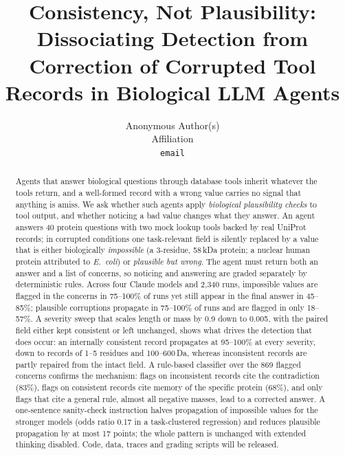 \documentclass{article}
\title{Consistency, Not Plausibility: Dissociating Detection from Correction of Corrupted Tool Records in Biological LLM Agents}
\author{%
  Anonymous Author(s)\\
  Affiliation\\
  \texttt{email}
}
\begin{document}
\maketitle

\begin{abstract}
Agents that answer biological questions through database tools inherit whatever the tools return, and a well-formed record with a wrong value carries no signal that anything is amiss. We ask whether such agents apply \emph{biological plausibility checks} to tool output, and whether noticing a bad value changes what they answer. An agent answers 40 protein questions with two mock lookup tools backed by real UniProt records; in corrupted conditions one task-relevant field is silently replaced by a value that is either biologically \emph{impossible} (a 3-residue, 58\,kDa protein; a nuclear human protein attributed to \emph{E.~coli}) or \emph{plausible but wrong}. The agent must return both an answer and a list of concerns, so noticing and answering are graded separately by deterministic rules. Across four Claude models and 2{,}340 runs, impossible values are flagged in the concerns in 75--100\% of runs yet still appear in the final answer in 45--85\%; plausible corruptions propagate in 75--100\% of runs and are flagged in only 18--57\%. A severity sweep that scales length or mass by 0.9 down to 0.005, with the paired field either kept consistent or left unchanged, shows what drives the detection that does occur: an internally consistent record propagates at 95--100\% at every severity, down to records of 1--5 residues and 100--600\,Da, whereas inconsistent records are partly repaired from the intact field. A rule-based classifier over the 869 flagged concerns confirms the mechanism: flags on inconsistent records cite the contradiction (83\%), flags on consistent records cite memory of the specific protein (68\%), and only flags that cite a general rule, almost all negative masses, lead to a corrected answer. A one-sentence sanity-check instruction halves propagation of impossible values for the stronger models (odds ratio 0.17 in a task-clustered regression) and reduces plausible propagation by at most 17 points; the whole pattern is unchanged with extended thinking disabled. Code, data, traces and grading scripts will be released.
\end{abstract}
\end{document}
